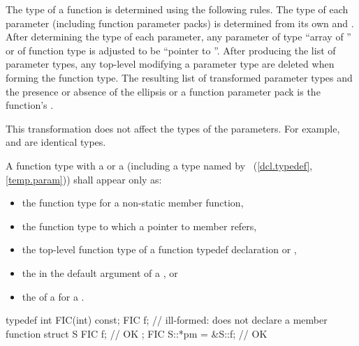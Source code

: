 \pnum
{}%
The type of a function is determined using the following rules.
The type of each parameter (including function parameter packs) is
determined from its own
and
.
After determining the type of each parameter, any parameter
%
of type ``array of '' or
%
of function type 
is adjusted to be ``pointer to ''.
After producing the list of parameter types,
any top-level
modifying a parameter type are deleted
when forming the function type.
The resulting list of transformed parameter types
and the presence or absence of the ellipsis or a function parameter pack
is the function's
.
\begin{note} This transformation does not affect the types of the parameters.
For example,  and
 are identical types. \end{note}

\pnum
A function type with a  or a
 (including a type named by
~(\ref{dcl.typedef}, \ref{temp.param}))
shall appear only as:
\begin{itemize}
\item the function type for a non-static member function,

\item the function type to which a pointer to member refers,

\item the top-level function type of a function typedef declaration
or ,

\item the  in the default argument of a
, or

\item the  of a  for a
.
\end{itemize}
\begin{example}

\begin{codeblock}
typedef int FIC(int) const;
FIC f;              // ill-formed: does not declare a member function
struct S {
  FIC f;            // OK
};
FIC S::*pm = &S::f; // OK
\end{codeblock}
\end{example}

